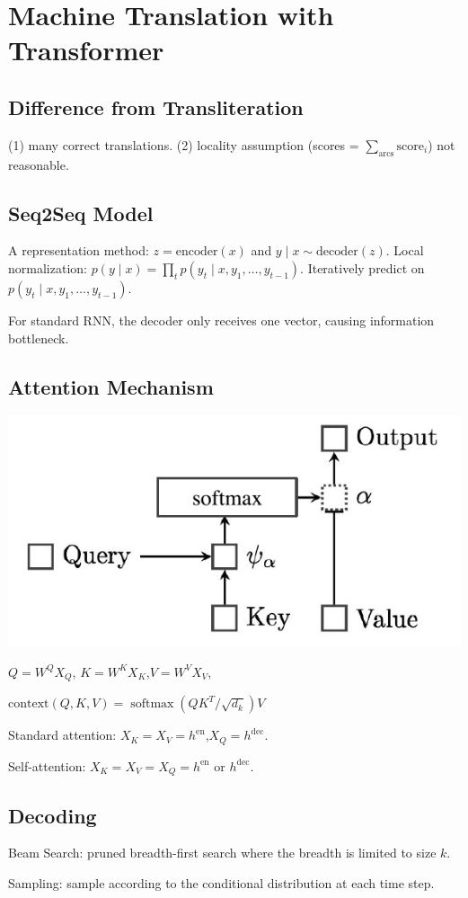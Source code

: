 \section{Machine Translation with Transformer}

\subsection*{Difference from Transliteration}

(1) many correct translations. (2) locality assumption (scores = $\sum_{\mathrm{arcs}}\mathrm{score}_{i}$) not reasonable.

\subsection*{Seq2Seq Model}

A representation method: $z=\mathrm{encoder}(x)$ and $y\mid x \sim \mathrm{decoder}(z)$. 
Local normalization: $p(y\mid x)=\prod_{t} p(y_t\mid x, y_1, \dots, y_{t-1})$.
Iteratively predict on $p(y_t\mid x, y_1, \dots, y_{t-1})$.  

For standard RNN, the decoder only receives one vector, causing information bottleneck.

\subsection*{Attention Mechanism}

\begin{center}
    \includegraphics[width=.6\columnwidth]{img/attention.png}
\end{center}
\vspace{-0.5cm}
$Q=W^{Q} X_Q$, $K=W^{K} X_K$,$V=W^{V} X_V$, 

$\mathrm{context}(Q, K, V)=\operatorname{softmax}\left( Q K^{T} / \sqrt{d_{k}}\right) V$

Standard attention: $X_K=X_V=h^{\mathrm{en}}$,$X_Q=h^{\mathrm{dec}}$.

Self-attention: $X_K=X_V=X_Q=h^{\mathrm{en}}$ or $h^{\mathrm{dec}}$.

\subsection*{Decoding}

Beam Search: pruned breadth-first search where the breadth is limited to size $k$.

Sampling: sample according to the conditional distribution at each time step.
